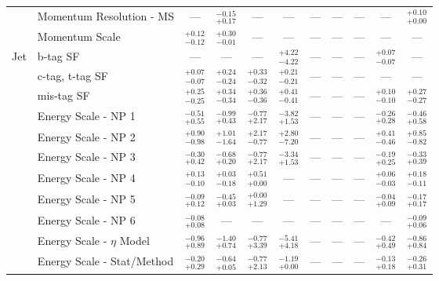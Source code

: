 \begin{tabular}{|cl||ccccccc|c||c|}
\cline{2-11}
&Momentum Resolution - MS & --- &  $^{-0.15}_{+0.17}$  & --- & --- & --- & --- & --- & --- &  $^{+0.10}_{+0.00}$ \\ 
\cline{2-11}
&Momentum Scale &  $^{+0.12}_{-0.12}$  &  $^{+0.30}_{-0.01}$  & --- & --- & --- & --- & --- & --- & ---\\ 
\hline
\multirow{22}{*}{Jet}
&b-tag SF & --- & --- & --- &  $^{+4.22}_{-4.22}$  & --- & --- & --- &  $^{+0.07}_{-0.07}$  & ---\\ 
\cline{2-11}
&c-tag, t-tag SF &  $^{+0.07}_{-0.07}$  &  $^{+0.24}_{-0.24}$  &  $^{+0.33}_{-0.32}$  &  $^{+0.21}_{-0.21}$  & --- & --- & --- & --- & ---\\ 
\cline{2-11}
&mis-tag SF &  $^{+0.25}_{-0.25}$  &  $^{+0.34}_{-0.34}$  &  $^{+0.36}_{-0.36}$  &  $^{+0.41}_{-0.41}$  & --- & --- & --- &  $^{+0.10}_{-0.10}$  &  $^{+0.27}_{-0.27}$ \\ 
\cline{2-11}
&Energy Scale - NP 1 &  $^{-0.51}_{+0.55}$  &  $^{-0.99}_{+0.43}$  &  $^{-0.77}_{+2.17}$  &  $^{-3.82}_{+1.53}$  & --- & --- & --- &  $^{-0.26}_{+0.28}$  &  $^{-0.46}_{+0.58}$ \\ 
\cline{2-11}
&Energy Scale - NP 2 &  $^{+0.90}_{-0.98}$  &  $^{+1.01}_{-1.64}$  &  $^{+2.17}_{-0.77}$  &  $^{+2.80}_{-7.20}$  & --- & --- & --- &  $^{+0.41}_{-0.46}$  &  $^{+0.85}_{-0.82}$ \\ 
\cline{2-11}
&Energy Scale - NP 3 &  $^{-0.30}_{+0.42}$  &  $^{-0.68}_{+0.20}$  &  $^{-0.77}_{+2.17}$  &  $^{-3.34}_{+1.53}$  & --- & --- & --- &  $^{-0.19}_{+0.25}$  &  $^{-0.33}_{+0.39}$ \\ 
\cline{2-11}
&Energy Scale - NP 4 &  $^{+0.13}_{-0.10}$  &  $^{+0.03}_{-0.18}$  &  $^{+0.51}_{+0.00}$  & --- & --- & --- & --- &  $^{+0.06}_{-0.03}$  &  $^{+0.18}_{-0.11}$ \\ 
\cline{2-11}
&Energy Scale - NP 5 &  $^{-0.09}_{+0.12}$  &  $^{-0.45}_{+0.03}$  &  $^{+0.00}_{+1.29}$  & --- & --- & --- & --- &  $^{-0.04}_{+0.09}$  &  $^{-0.17}_{+0.17}$ \\ 
\cline{2-11}
&Energy Scale - NP 6 &  $^{-0.08}_{+0.08}$  & --- & --- & --- & --- & --- & --- & --- &  $^{-0.09}_{+0.06}$ \\ 
\cline{2-11}
&Energy Scale - $\eta$ Model &  $^{-0.96}_{+0.89}$  &  $^{-1.40}_{+0.74}$  &  $^{-0.77}_{+3.39}$  &  $^{-5.41}_{+4.18}$  & --- & --- & --- &  $^{-0.42}_{+0.49}$  &  $^{-0.86}_{+0.84}$ \\ 
\cline{2-11}
&Energy Scale - Stat/Method &  $^{-0.20}_{+0.29}$  &  $^{-0.64}_{+0.05}$  &  $^{-0.77}_{+2.13}$  &  $^{-1.19}_{+0.00}$  & --- & --- & --- &  $^{-0.13}_{+0.18}$  &  $^{-0.26}_{+0.31}$ \\ 

\end{tabular}
